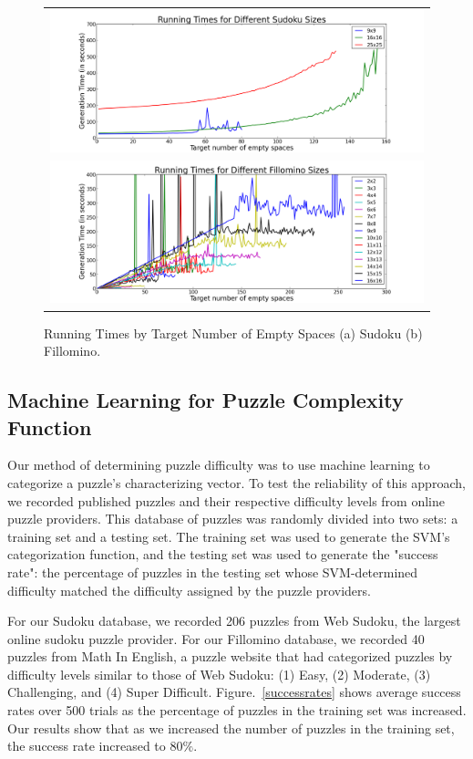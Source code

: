 \begin{figure}[!htpb]
\centering
\begin{tabular}{c}
 \includegraphics[scale=0.4]{experimentgraphs/SudokuRunTime3.png}
\\
\includegraphics[scale=0.4]{experimentgraphs/fillominoRunTime3.png}
\end{tabular}
\caption{Running Times by Target Number of Empty Spaces (a) Sudoku (b) Fillomino.}
\label{runtimes}
\end{figure}

\subsection{Machine Learning for Puzzle Complexity Function}

Our method of determining puzzle difficulty was to use machine learning to categorize a puzzle's characterizing vector. To test the reliability of this approach, we recorded published puzzles and their respective difficulty levels from online puzzle providers. This database of puzzles was randomly divided into two sets: a training set and a testing set. The training set was used to generate the SVM's categorization function, and the testing set was used to generate the "success rate": the percentage of puzzles in the testing set whose SVM-determined difficulty matched the difficulty assigned by the puzzle providers. 

For our Sudoku database, we recorded 206 puzzles from Web Sudoku, the largest online sudoku puzzle provider. For our Fillomino database, we recorded 40 puzzles from Math In English, a puzzle website that had categorized puzzles by difficulty levels similar to those of Web Sudoku: (1) Easy, (2) Moderate, (3) Challenging, and (4) Super Difficult. Figure.~\ref{successrates} shows average success rates over 500 trials as the percentage of puzzles in the training set was increased. Our results show that as we increased the number of puzzles in the training set, the success rate increased to $80 \%$.

